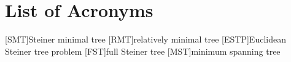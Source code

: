 {
\abnormalparskip{0pt}
\chapter{List of Acronyms}
}

\begin{acronym}[ESTP]
  [SMT]{Steiner minimal tree}
  [RMT]{relatively minimal tree}
  [ESTP]{Euclidean Steiner tree problem}
  [FST]{full Steiner tree}
  [MST]{minimum spanning tree}
\end{acronym}

